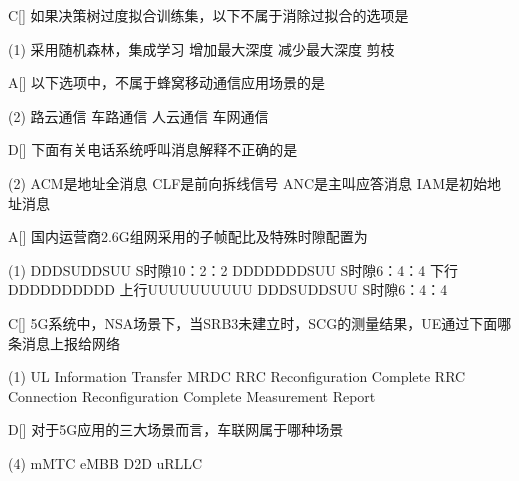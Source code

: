 \begin{choice}{C}[]
    如果决策树过度拟合训练集，以下不属于消除过拟合的选项是
    \begin{tasks}(1)
        \task 采用随机森林，集成学习
        \task 增加最大深度
        \task 减少最大深度
        \task 剪枝
    \end{tasks}
\end{choice}


\begin{choice}{A}[]
    以下选项中，不属于蜂窝移动通信应用场景的是
    \begin{tasks}(2)
        \task 路云通信
        \task 车路通信
        \task 人云通信
        \task 车网通信
    \end{tasks}
\end{choice}



\begin{choice}{D}[]
    下面有关电话系统呼叫消息解释不正确的是
    \begin{tasks}(2)
        \task ACM是地址全消息
        \task CLF是前向拆线信号
        \task ANC是主叫应答消息
        \task IAM是初始地址消息
    \end{tasks}
\end{choice}


\begin{choice}{A}[]
    国内运营商2.6G组网采用的子帧配比及特殊时隙配置为
    \begin{tasks}(1)
        \task DDDSUDDSUU S时隙10：2：2
        \task DDDDDDDSUU S时隙6：4：4
        \task 下行DDDDDDDDDD 上行UUUUUUUUUU
        \task DDDSUDDSUU S时隙6：4：4
    \end{tasks}
\end{choice}


\begin{choice}{C}[]
    5G系统中，NSA场景下，当SRB3未建立时，SCG的测量结果，UE通过下面哪条消息上报给网络
    \begin{tasks}(1)
        \task UL Information Transfer MRDC
        \task  RRC Reconfiguration Complete
        \task RRC Connection Reconfiguration Complete
        \task Measurement Report
    \end{tasks}
\end{choice}


\begin{choice}{D}[]
    对于5G应用的三大场景而言，车联网属于哪种场景
    \begin{tasks}(4)
        \task mMTC
        \task eMBB
        \task D2D
        \task uRLLC
    \end{tasks}
\end{choice}

